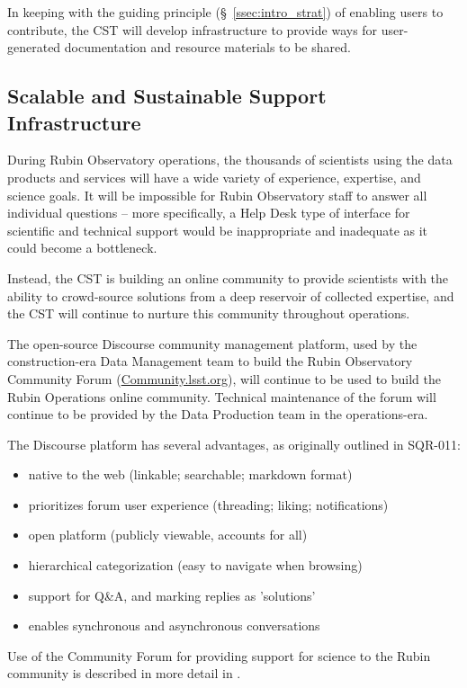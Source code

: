 \documentclass[DM,authoryear,toc]{lsstdoc}
\begin{document}
In keeping with the guiding principle (\S~\ref{ssec:intro_strat}) of enabling users to contribute, the CST will develop infrastructure to provide ways for user-generated documentation and resource materials to be shared.


\subsection{Scalable and Sustainable Support Infrastructure}\label{ssec:mod_support}

During Rubin Observatory operations, the thousands of scientists using the data products and services will have a wide variety of experience, expertise, and science goals.
It will be impossible for Rubin Observatory staff to answer all individual questions -- more specifically, a Help Desk type of interface for scientific and technical support would be inappropriate and inadequate as it could become a bottleneck.

Instead, the CST is building an online community to provide scientists with the ability to crowd-source solutions from a deep reservoir of collected expertise, and the CST will continue to nurture this community throughout operations.

The open-source Discourse community management platform, used by the construction-era Data Management team to build the Rubin Observatory Community Forum (\url{Community.lsst.org}), will continue to be used to build the Rubin Operations online community.
Technical maintenance of the forum will continue to be provided by the Data Production team in the operations-era. 

The Discourse platform has several advantages, as originally outlined in SQR-011: %
\begin{itemize}
\item native to the web (linkable; searchable; markdown format)
\item prioritizes forum user experience (threading; liking; notifications)
\item open platform (publicly viewable, accounts for all)
\item hierarchical categorization (easy to navigate when browsing)
\item support for Q\&A, and marking replies as 'solutions'
\item enables synchronous and asynchronous conversations
\end{itemize}

Use of the Community Forum for providing support for science to the Rubin community is described in more detail in .
\end{document}
